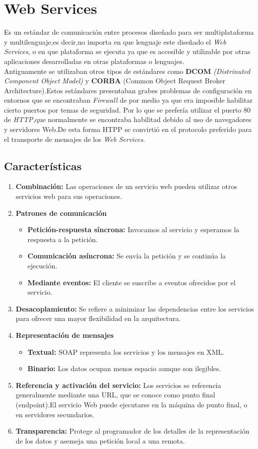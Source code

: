 \section{Web Services}
Es un estándar de comunicación entre procesos diseñado para ser multiplataforma y multilenguaje,es decir,no importa en que lenguaje este diseñado el \textit{Web Services}\cite{webservices}, o en que plataforma se ejecuta ya que es accesible y utilizable por otras aplicaciones desarrolladas en otras plataformas o lenguajes.
\\Antiguamente se utilizaban otros tipos de estándares como \textbf{DCOM} \textit{(Distrinuted Component Object Model)} y \textbf{CORBA} (Common Object Request Broker Architecture).Estos estándares presentaban grabes problemas de configuración en entornos que se encontraban \textit{Firewall} de por medio ya que era imposible habilitar cierto puertos por temas de seguridad.
Por lo que se prefería utilizar el puerto 80 de \textit{HTTP},que normalmente se encontraba habilitad debido al uso de navegadores y servidores Web.De esta forma HTPP se convirtió en el protocolo preferido para el transporte de mensajes de los \textit{Web Services}.
\subsection{Características}
\begin{enumerate}
\item \textbf{Combinación:} Las operaciones de un servicio web pueden utilizar otros servicios web para sus operaciones.
\item \textbf{Patrones de comunicación}
  \begin{itemize}
  	\item \textbf{Petición-respuesta síncrona:} Invocamos al servicio y esperamos la respuesta a la petición.
    \item \textbf{Comunicación asíncrona:} Se envía la petición y se continúa la ejecución.
    \item \textbf{Mediante eventos:} El cliente se suscribe a eventos ofrecidos por el servicio.
  \end{itemize}
\item \textbf{Desacoplamiento:} Se refiere a minimizar las dependencias entre los servicios para ofrecer una mayor flexibilidad en la arquitectura.
\item \textbf{Representación de mensajes}
  \begin{itemize}
  	\item \textbf{Textual:} SOAP representa los servicios y los mensajes en XML.
    \item \textbf{Binario:} Los datos ocupan menos espacio aunque son ilegibles.
  \end{itemize}
\item \textbf{Referencia y activación del servicio:} Los servicios se referencia generalmente mediante una URL, que se conoce como punto final (endpoint).El servicio Web puede ejecutarse en la máquina de punto final, o en servidores secundarios.
\item \textbf{Transparencia:} Protege al programador de los detalles de la representación
de los datos y asemeja una petición local a una remota.
\end{enumerate}
